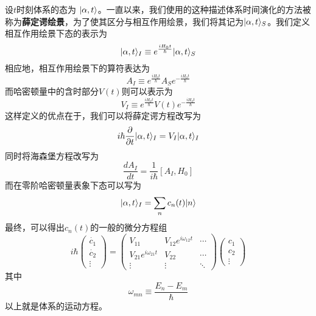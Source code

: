 设$ t $时刻体系的态为
$ |\alpha,t\rangle $。一直以来，我们使用的这种描述体系时间演化的方法被称为\textbf{薛定谔绘景}，为了使其区分与相互作用绘景，我们将其记为$ |\alpha,t\rangle_S $。我们定义相互作用绘景下态的表示为
\begin{equation}\label{key}
|\alpha,t\rangle_I\equiv e^{\frac{iH_0t}{\hbar}}|\alpha,t\rangle_S
\end{equation}
相应地，相互作用绘景下的算符表达为
\begin{equation}\label{key}
A_I\equiv e^{\frac{iH_0t}{\hbar}}A_Se^{-\frac{iH_0t}{\hbar}}
\end{equation}
而哈密顿量中的含时部分$ V(t) $则可以表示为
\begin{equation}\label{key}
V_I\equiv e^{\frac{iH_0t}{\hbar}}V(t)e^{-\frac{iH_0t}{\hbar}}
\end{equation}
这样定义的优点在于，我们可以将薛定谔方程改写为
\begin{equation}\label{key}
i\hbar\frac{\partial}{\partial t}|\alpha,t\rangle_I=V_I|\alpha,t\rangle_I
\end{equation}
同时将海森堡方程改写为
\begin{equation}\label{key}
\dfrac{dA_I}{dt}=\dfrac{1}{i\hbar}[A_I,H_0]
\end{equation}
而在零阶哈密顿量表象下态可以写为
\begin{equation}\label{key}
|\alpha,t\rangle_I=\sum_nc_n(t)|n\rangle
\end{equation}
最终，可以得出$ c_n(t) $的一般的微分方程组
\begin{equation}\label{key}
i\hbar\begin{pmatrix}
\dot{c_1}\\\dot{c_2}\\\vdots
\end{pmatrix}=\begin{pmatrix}
V_{11}&V_{12}e^{i\omega_{12}t}&\cdots\\
V_{21}e^{i\omega_{21}t}&V_{22}&\cdots\\
\vdots&\vdots&\ddots
\end{pmatrix}\begin{pmatrix}
c_1\\c_2\\\vdots
\end{pmatrix}
\end{equation}
其中
\begin{equation}\label{key}
\omega_{mn}\equiv\dfrac{E_n-E_m}{\hbar}
\end{equation}
以上就是体系的运动方程。

